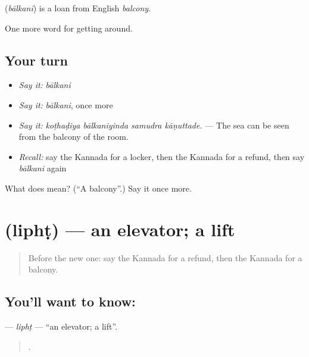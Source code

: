 \begin{cousinweb}
\textbf{} (\emph{bālkani}) is a loan from English \emph{balcony}.
\end{cousinweb}

\begin{grammarlens}[title={What you've built}]
One more word for getting around.
\end{grammarlens}

\subsection*{Your turn}
\begin{itemize}
\raggedright
  \item \emph{Say it:} \emph{bālkani}
  \item \emph{Say it:} \emph{bālkani}, once more
  \item \emph{Say it:} \emph{koṭhaḍiya bālkaniyinda samudra kāṇuttade.} — The sea can be seen from the balcony of the room.
  \item \emph{Recall:} say the Kannada for a locker, then the Kannada for a refund, then say \emph{bālkani} again
\end{itemize}

\begin{tcolorbox}[breakable,colback=teal!4,colframe=teal!35!black,title={Before you move on}]
What does  mean? (\textquotedblleft{}A balcony\textquotedblright{}.) Say it once more.
\end{tcolorbox}
\section[\texorpdfstring{\kn{ಲಿಫ್ಟ್} (liphṭ)}{ಲಿಫ್ಟ್ (liphṭ)}]{ (liphṭ) — an elevator; a lift}

\label{lesson:KA-C462-lipht}



\begin{quote}
Before the new one: say the Kannada for a refund, then the Kannada for a balcony.
\end{quote}

\subsection*{You'll want to know: }
\textbf{} — \emph{liphṭ} — \textquotedblleft{}an elevator; a lift\textquotedblright{}.

\begin{quote}
      .
\end{quote}

